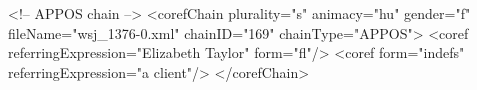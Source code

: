 <!-- APPOS chain  -->
    <corefChain plurality="s" animacy="hu" gender="f" fileName="wsj_1376-0.xml"
        chainID="169" chainType="APPOS">
        <coref referringExpression="Elizabeth Taylor" form="fl"/>
        <coref form="indefs" referringExpression="a client"/>
    </corefChain>
